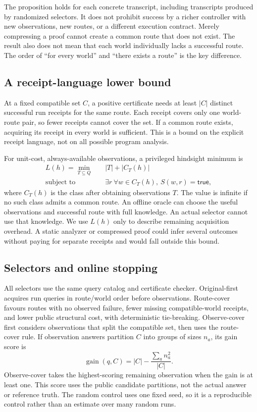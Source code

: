 \documentclass[conference]{IEEEtran}
\newcommand{\Yes}{\mathsf{true}}
\begin{document}
The proposition holds for each concrete transcript, including transcripts produced by randomized selectors. It does not prohibit success by a richer controller with new observations, new routes, or a different execution contract. Merely compressing a proof cannot create a common route that does not exist. The result also does not mean that each world individually lacks a successful route. The order of ``for every world'' and ``there exists a route'' is the key difference.

\subsection{A receipt-language lower bound}
At a fixed compatible set $C$, a positive certificate needs at least $|C|$ distinct successful run receipts for the same route. Each receipt covers only one world-route pair, so fewer receipts cannot cover the set. If a common route exists, acquiring its receipt in every world is sufficient. This is a bound on the explicit receipt language, not on all possible program analysis.

For unit-cost, always-available observations, a privileged hindsight minimum is
\begin{equation}
\begin{aligned}
L(h)=\min_{T\subseteq Q}\quad& |T|+|C_T(h)|\\
\text{subject to}\quad&\exists r\ \forall w\in C_T(h),\ S(w,r)=\Yes,
\end{aligned}
\label{eq:bound}
\end{equation}
where $C_T(h)$ is the class after obtaining observations $T$. The value is infinite if no such class admits a common route. An offline oracle can choose the useful observations and successful route with full knowledge. An actual selector cannot use that knowledge. We use $L(h)$ only to describe remaining acquisition overhead. A static analyzer or compressed proof could infer several outcomes without paying for separate receipts and would fall outside this bound.

\subsection{Selectors and online stopping}
All selectors use the same query catalog and certificate checker. Original-first acquires run queries in route/world order before observations. Route-cover favours routes with no observed failure, fewer missing compatible-world receipts, and lower public structural cost, with deterministic tie-breaking. Observe-cover first considers observations that split the compatible set, then uses the route-cover rule. If observation answers partition $C$ into groups of sizes $n_a$, its gain score is
\begin{equation}
\operatorname{gain}(q,C)=|C|-\frac{\sum_a n_a^2}{|C|}.
\end{equation}
Observe-cover takes the highest-scoring remaining observation when the gain is at least one. This score uses the public candidate partitions, not the actual answer or reference truth. The random control uses one fixed seed, so it is a reproducible control rather than an estimate over many random runs.
\end{document}
